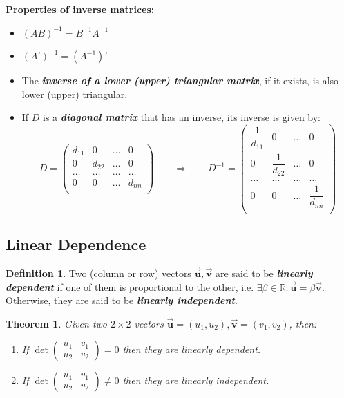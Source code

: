 \documentclass[a4paper,11pt]{article}
\theoremstyle{definition}
\newtheorem{definition}{Definition}
\theoremstyle{plain}
\newtheorem{theorem}{Theorem}
\begin{document}
\textbf{Properties of inverse matrices:} 
\begin{itemize}
    \item \(\left(AB\right)^{-1} = B^{-1} A^{-1}\) 
    \item \(\left(A'\right)^{-1} = \left(A^{-1}\right)'\) 
    \item The \textbf{\emph{inverse of a lower (upper) triangular matrix}}, if it exists, is also lower (upper) triangular. 
    \item If \(D\) is a \textbf{\emph{diagonal matrix}} that has an inverse, its inverse is given by: 
    \[ 
    D = \begin{pmatrix} d_{11} & 0 & \ldots & 0 \\ 0 & d_{22} & \ldots & 0 \\\ldots & \ldots & \ldots & \ldots \\ 0 & 0 & \ldots & d_{nn} \\ \end{pmatrix} \qquad \Rightarrow \qquad D ^{-1} = \begin{pmatrix} \dfrac{1}{d_{11}} & 0 & \ldots & 0 \\  0 & \dfrac{1}{d_{22}} & \ldots & 0 \\ \ldots & \ldots & \ldots & \ldots \\ 0 & 0 & \ldots & \dfrac{1}{d_{nn}} \\ \end{pmatrix} 
    \]
\end{itemize}

\subsection{Linear Dependence}\label{linear-dependence}

\begin{definition}
Two (column or row) vectors \(\vec{\mathbf{u}},\vec{\mathbf{v}}\) are said to be
\textbf{\emph{linearly dependent}} if one of them is proportional to the
other, i.e. \(\exists\beta\in\mathbb{R} : \vec{\mathbf{u}} = \beta\vec{\mathbf{v}}\).
Otherwise, they are said to be \textbf{\emph{linearly independent}}.
\end{definition}

\begin{theorem}
Given two \(2\times 2\) vectors \(\vec{\mathbf{u}} = (u_1, u_2), \vec{\mathbf{v}} = (v_1, v_2)\), then:

\begin{enumerate}
    \item If \(\det\begin{pmatrix} u_1 & v_1 \\ u_2 & v_2 \end{pmatrix} = 0\) then they are linearly dependent.

    \item If \(\det\begin{pmatrix} u_1 & v_1 \\ u_2 & v_2 \end{pmatrix} \neq 0\) then they are linearly independent.
\end{enumerate}
\end{theorem}
\end{document}
